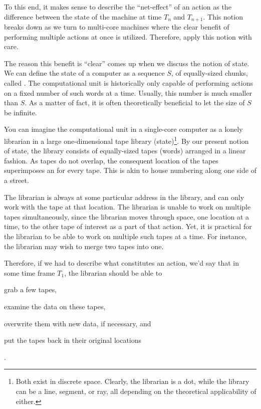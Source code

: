 To this end, it makes sense to describe the ``net-effect'' of an action as the
difference between the state of the machine at time $T_n$ and $T_{n+1}$. This
notion breaks down as we turn to multi-core machines where the clear benefit of
performing multiple actions at once is utilized. Therefore, apply this notion
with care.

The reason this benefit is ``clear'' comes up when we discuss the notion of
state. We can define the state of a computer as a sequence $S$, of
equally-sized chunks, called . The computational unit is historically
only capable of performing actions on a fixed number of such words at a time.
Usually, this number is much smaller than $S$. As a matter of fact, it is often
theoretically beneficial to let the size of $S$ be infinite.

You can imagine the computational unit in a single-core computer as a lonely
librarian in a large one-dimensional tape library (state)\footnote{Both exist
in discrete space. Clearly, the librarian is a dot, while the library can be a
line, segment, or ray, all depending on the theoretical applicability of
either.}. By our present notion of state, the library consists of equally-sized
tapes (words) arranged in a linear fashion.  As tapes do not overlap, the
consequent location of the tapes superimposes an  for every tape.
This is akin to house numbering along one side of a street.


The librarian is always at some particular address in the library, and can only
work with the tape at that location. The librarian is unable to work on
multiple tapes simultaneously, since the librarian moves through space, one
location at a time, to the other tape of interest as a part of that action.
Yet, it is practical for the librarian to be able to work on multiple such
tapes at a time. For instance, the librarian may wish to merge two tapes into
one.



Therefore, if we had to describe what constitutes an action, we'd say that in
some time frame $T_1$, the librarian should be able to \begin{inparaenum}[(1)]
\item grab a few tapes, \item examine the data on these tapes, \item overwrite
them with new data, if necessary, and \item put the tapes back in their
original locations\end{inparaenum}.

